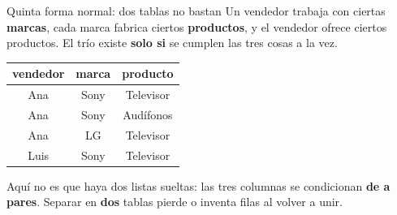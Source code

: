 \documentclass[aspectratio=169,10pt,c]{beamer}
\newcommand{\fn}[1]{\tikz[baseline=-0.5ex]{\node[rounded corners=2pt,fill=utpRojo,text=white,
  font=\bfseries\small,inner xsep=6pt,inner ysep=3pt] {#1};}}
\begin{document}

\begin{frame}{\fn{5FN} Quinta forma normal: dos tablas no bastan}
\small Un vendedor trabaja con ciertas \textbf{marcas}, cada marca fabrica ciertos \textbf{productos}, y el vendedor ofrece ciertos productos. El trío existe \textbf{solo si} se cumplen las tres cosas a la vez.
\vspace{0.15cm}
\begin{center}
\footnotesize
\begin{tabular}{ccc}
\toprule
\bfseries vendedor & \bfseries marca & \bfseries producto \\
\midrule
Ana  & Sony & Televisor \\
Ana  & Sony & Audífonos \\
Ana  & LG   & Televisor \\
Luis & Sony & Televisor \\
\bottomrule
\end{tabular}
\end{center}
\vspace{0.15cm}
\small Aquí no es que haya dos listas sueltas: las tres columnas se condicionan \textbf{de a pares}. Separar en \textbf{dos} tablas pierde o inventa filas al volver a unir.
\end{frame}
\end{document}
